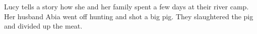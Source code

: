 Lucy tells a story how she and her family spent a few days at their river camp. Her husband Abia went off hunting and shot a big pig. They slaughtered the pig and divided up the meat.
